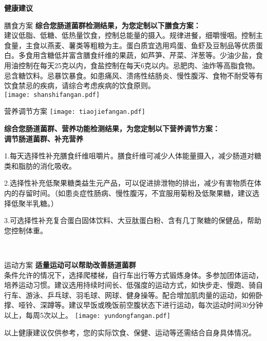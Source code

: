 

\usepackage{graphicx}
\graphicspath{{cores/}}



\vspace*{5mm}
\setlength{\arrayrulewidth}{1pt}
\fontsize{9.3pt}{11pt}\selectfont
\color{gray2}

\centerline{\bf\sanhao 健康建议}

\vspace*{2mm}

\begin{LRaside}[.20]{膳食方案}
{\bf *综合您肠道菌群检测结果，为您定制以下膳食方案：}\\
{\indent 建议低脂、低糖、低热量饮食，控制总能量的摄入。规律进餐，细嚼慢咽。控制主食量，主食以燕麦、薯类等粗粮为主。蛋白质宜选用鸡蛋、鱼虾及豆制品等优质蛋白。多食用含糖低并富含膳食纤维的果蔬，如芦笋、芹菜、洋葱等。少油少盐，食用油控制在每天25克以内，食盐控制在每天6克以内。忌肥肉、油炸等高脂食物。忌含糖饮料。忌暴饮暴食。如患痛风、溃疡性结肠炎、慢性腹泻、食物不耐受等有饮食禁忌的疾病，请综合考虑疾病的饮食原则。}\\
\asidebreak %
\noindent
\texttt{[image: shanshifangan.pdf]}

\end{LRaside}


\begin{LRaside}[.70]{营养调节方案}
\noindent
\texttt{[image: tiaojiefangan.pdf]}

\asidebreak %
{\bf *综合您肠道菌群、营养功能检测结果，为您定制以下营养调节方案：}\\
{\bf 调节肠道菌群、补充营养}\\{\indent 1.每天选择性补充膳食纤维咀嚼片。膳食纤维可减少人体能量摄入，减少肠道对糖类和脂肪的消化吸收。 

2.选择性补充低聚果糖类益生元产品，可以促进排泄物的排出，减少有害物质在体内的存留时间。（如患炎症性肠病、慢性腹泻，不宜服用菊粉及低聚果糖，建议选择低聚半乳糖。）

3.可选择性补充复合蛋白固体饮料、大豆肽蛋白粉、含有几丁聚糖的保健品，帮助您控制体重。}\\
\end{LRaside}

\begin{LRaside}[.20]{运动方案}
{\bf *适量运动可以帮助改善肠道菌群}\\
{\indent 条件允许的情况下，选择爬楼梯，自行车出行等方式锻炼身体。多参加团体运动，培养运动习惯。建议选用持续时间长、低强度的运动方式，如快步走、慢跑、骑自行车、游泳、乒乓球、羽毛球、网球、健身操等。配合增加肌肉量的运动，如俯卧撑、哑铃、深蹲等。建议早饭或晚饭前空腹状态下进行运动，每次运动时间30分钟以上，每周5次以上。}
\asidebreak %
\noindent
\texttt{[image: yundongfangan.pdf]}

\end{LRaside}

{\noindent\qihao *以上健康建议仅供参考，您的实际饮食、保健、运动等还需结合自身具体情况。}


